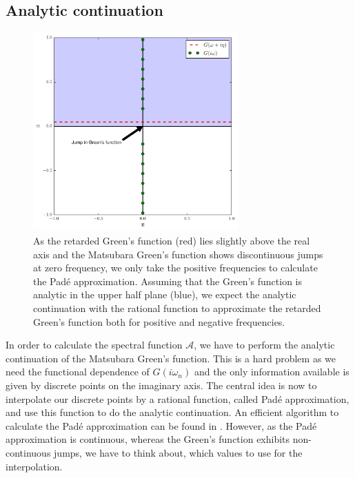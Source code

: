 \begin{appendix}
\section{Analytic continuation}
\begin{figure}[htb]
  \begin{center}
    \includegraphics[width=0.7\textwidth]{analytic_continuation}
  \end{center}
  \caption{As the retarded Green's function (red) lies slightly above the real axis and the Matsubara Green's function shows discontinuous jumps at zero frequency, we only take the positive frequencies to calculate the Padé approximation. Assuming that the Green's function is analytic in the upper half plane (blue), we expect the analytic continuation with the rational function to approximate the retarded Green's function both for positive and negative frequencies. }
  \label{fig:analytic_continuation}
\end{figure}


In order to calculate the spectral function $\mathcal{A}$, we have to perform the analytic continuation of the Matsubara Green's function.
This is a hard problem as we need the functional dependence of $G(iω_n)$ and the only information available is given by discrete points on the imaginary axis.
The central idea is now to interpolate our discrete points by a rational function, called Padé approximation, and use this function to do the analytic continuation. 
An efficient algorithm to calculate the Padé approximation can be found in \cite{padepaper}. However, as the Padé approximation is continuous, whereas the Green's function exhibits non-continuous jumps, we have to think about, which values to use for the interpolation.


\end{appendix}
